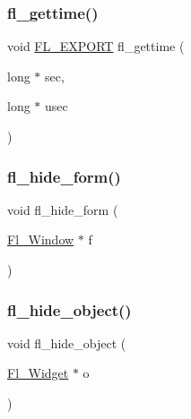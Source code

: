 \mbox{\label{forms_8_h_ab6f3c334331274c5a76cc69b06cc8781}} 
\subsubsection{\texorpdfstring{fl\+\_\+gettime()}{fl\_gettime()}}
{\footnotesize\ttfamily void \hyperlink{_fl___export_8_h_aa9ba29a18aee9d738370a06eeb4470fc}{F\+L\+\_\+\+E\+X\+P\+O\+RT} fl\+\_\+gettime (\begin{DoxyParamCaption}\item[{long $\ast$}]{sec,  }\item[{long $\ast$}]{usec }\end{DoxyParamCaption})}

\mbox{\label{forms_8_h_a64225f30ccb8408b687890a1a2167af2}} 
\subsubsection{\texorpdfstring{fl\+\_\+hide\+\_\+form()}{fl\_hide\_form()}}
{\footnotesize\ttfamily void fl\+\_\+hide\+\_\+form (\begin{DoxyParamCaption}\item[{\hyperlink{class_fl___window}{Fl\+\_\+\+Window} $\ast$}]{f }\end{DoxyParamCaption})\hspace{0.3cm}{\ttfamily [inline]}}

\mbox{\label{forms_8_h_a2c0efa35a0e3e305fbfecfe9160c0e76}} 
\subsubsection{\texorpdfstring{fl\+\_\+hide\+\_\+object()}{fl\_hide\_object()}}
{\footnotesize\ttfamily void fl\+\_\+hide\+\_\+object (\begin{DoxyParamCaption}\item[{\hyperlink{class_fl___widget}{Fl\+\_\+\+Widget} $\ast$}]{o }\end{DoxyParamCaption})\hspace{0.3cm}{\ttfamily [inline]}}

